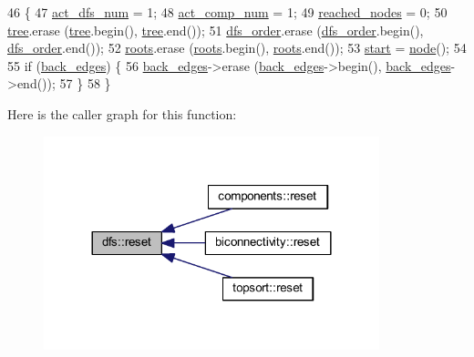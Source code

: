 \begin{DoxyCode}
46 \{
47     \mbox{\hyperlink{classdfs_aedaf2b485ff83150b1de6c305922473b}{act\_dfs\_num}} = 1;
48     \mbox{\hyperlink{classdfs_ab0251ac30adfd569e214a64db7f3a905}{act\_comp\_num}} = 1;
49     \mbox{\hyperlink{classdfs_acb11186a1a2a2a1f38cdc0674340ba37}{reached\_nodes}} = 0;
50     \mbox{\hyperlink{classdfs_aed496b618a937723bfec0b463e17e8d5}{tree}}.erase (\mbox{\hyperlink{classdfs_aed496b618a937723bfec0b463e17e8d5}{tree}}.begin(), \mbox{\hyperlink{classdfs_aed496b618a937723bfec0b463e17e8d5}{tree}}.end());
51     \mbox{\hyperlink{classdfs_af70a73ace68afd91ef944f984c9f28d5}{dfs\_order}}.erase (\mbox{\hyperlink{classdfs_af70a73ace68afd91ef944f984c9f28d5}{dfs\_order}}.begin(), \mbox{\hyperlink{classdfs_af70a73ace68afd91ef944f984c9f28d5}{dfs\_order}}.end());
52     \mbox{\hyperlink{classdfs_a0bbd5cb8df26c891b74dadd84b46a06b}{roots}}.erase (\mbox{\hyperlink{classdfs_a0bbd5cb8df26c891b74dadd84b46a06b}{roots}}.begin(), \mbox{\hyperlink{classdfs_a0bbd5cb8df26c891b74dadd84b46a06b}{roots}}.end());
53     \mbox{\hyperlink{classdfs_af677cfc31fe06a18dd3a3aae7f7d112b}{start}} = \mbox{\hyperlink{classnode}{node}}();
54 
55     \textcolor{keywordflow}{if} (\mbox{\hyperlink{classdfs_a1dc18a7df8d6b238d5301c92fc7540fa}{back\_edges}}) \{
56     \mbox{\hyperlink{classdfs_a1dc18a7df8d6b238d5301c92fc7540fa}{back\_edges}}->erase (\mbox{\hyperlink{classdfs_a1dc18a7df8d6b238d5301c92fc7540fa}{back\_edges}}->begin(), \mbox{\hyperlink{classdfs_a1dc18a7df8d6b238d5301c92fc7540fa}{back\_edges}}->end());
57     \}
58 \}
\end{DoxyCode}
Here is the caller graph for this function\+:
\nopagebreak
\begin{figure}[H]
\begin{center}
\leavevmode
\includegraphics[width=276pt]{classdfs_affaffda8be8418d6dbf396c5b1d6b81a_icgraph}
\end{center}
\end{figure}
\mbox{\label{classdfs_af56fa2b736f0b924dba1257e18ba4b61}} 
